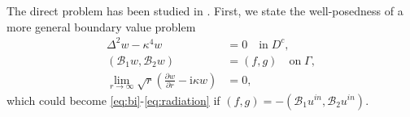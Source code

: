 \documentclass[10pt,a4paper]{article}
\numberwithin{equation}{section}
\begin{document}
The direct problem has been studied in \cite{bourgeois_well_2020}.
First, we state the well-posedness of a more general boundary value problem
  \begin{subequations}
    \label{eq:bvp}
    \begin{align}
      \label{eq:bvp-1}
    \Delta^2w - \kappa^4w &= 0 \quad \mathrm{in}\; D^{c},\\
       \label{eq:bvp-2}
    (\mathcal{B}_1w,\mathcal{B}_2w)&=(f,g)  \quad \mathrm{on}\; \Gamma,\\
        \label{eq:bvp-3}
    \lim\limits_{r\to\infty}\sqrt{r}\left(\frac{\partial w}{\partial r}
      -\mathrm{i}\kappa w \right)&=0,
    \end{align}
  \end{subequations}
 which could become  \eqref{eq:bi}-\eqref{eq:radiation} if $(f,g)=-(\mathcal{B}_1u^{in},\mathcal{B}_2 u^{in})$.
\end{document}
